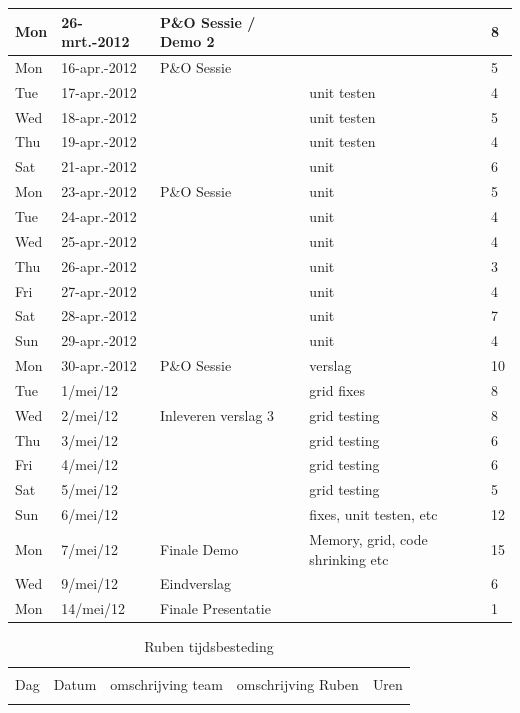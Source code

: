 \documentclass[12pt,a4paper]{report}
\begin{document}
\begin{landscape}
\begin{longtable}{llp{7cm}p{10cm}l}
\hline
Mon & 26-mrt.-2012 & P\&O Sessie / Demo 2 &  & 8 \\ 
\hline
Mon & 16-apr.-2012 & P\&O Sessie &  & 5 \\ 
\hline
Tue & 17-apr.-2012 &  & unit testen & 4 \\ 
\hline
Wed & 18-apr.-2012 &  & unit testen & 5 \\ 
\hline
Thu & 19-apr.-2012 &  & unit testen & 4 \\ 
\hline
Sat & 21-apr.-2012 &  & unit & 6 \\ 
\hline
Mon & 23-apr.-2012 & P\&O Sessie & unit & 5 \\ 
\hline
Tue & 24-apr.-2012 &  & unit & 4 \\ 
\hline
Wed & 25-apr.-2012 &  & unit & 4 \\ 
\hline
Thu & 26-apr.-2012 &  & unit & 3 \\ 
\hline
Fri & 27-apr.-2012 &  & unit & 4 \\ 
\hline
Sat & 28-apr.-2012 &  & unit & 7 \\ 
\hline
Sun & 29-apr.-2012 &  & unit & 4 \\ 
\hline
Mon & 30-apr.-2012 & P\&O Sessie & verslag & 10 \\ 
\hline
Tue & 1/mei/12 &  & grid fixes & 8 \\ 
\hline
Wed & 2/mei/12 & Inleveren verslag 3 & grid testing & 8 \\ 
\hline
Thu & 3/mei/12 &  & grid testing & 6 \\ 
\hline
Fri & 4/mei/12 &  & grid testing & 6 \\ 
\hline
Sat & 5/mei/12 &  & grid testing & 5 \\ 
\hline
Sun & 6/mei/12 &  & fixes, unit testen, etc & 12 \\ 
\hline
Mon & 7/mei/12 & Finale Demo & Memory, grid, code shrinking etc & 15 \\ 
\hline
Wed & 9/mei/12 & Eindverslag &  & 6 \\ 
\hline
Mon & 14/mei/12 & Finale Presentatie &  & 1 \\ 
\hline
\end{longtable}
\normalsize

\begin{longtable}{llp{7cm}p{10cm}l}
\caption{Ruben tijdsbesteding} \\

\hline \hline \\[-2ex]
  \multicolumn{1}{l}{Dag} & \multicolumn{1}{l}{Datum} &
  \multicolumn{1}{p{7cm}}{omschrijving team} &
  \multicolumn{1}{p{10cm}}{omschrijving Ruben} &
  \multicolumn{1}{l}{Uren}  \\[0.5ex] \hline \\[-1.8ex]
\endfirsthead


\end{longtable}
\end{landscape}
\end{document}
